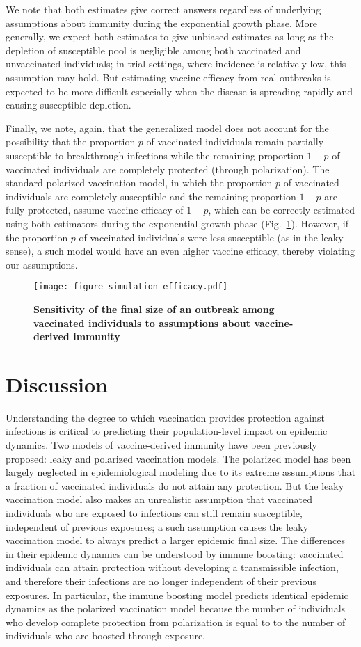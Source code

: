 \documentclass[12pt]{article}
\newcommand{\fref}[1]{Fig.~\ref{fig:#1}}
\begin{document}
We note that both estimates give correct answers regardless of underlying assumptions about immunity during the exponential growth phase.
More generally, we expect both estimates to give unbiased estimates as long as the depletion of susceptible pool is negligible among both vaccinated and unvaccinated individuals;
in trial settings, where incidence is relatively low, this assumption may hold.
But estimating vaccine efficacy from real outbreaks is expected to be more difficult especially when the disease is spreading rapidly and causing susceptible depletion.

Finally, we note, again, that the generalized model does not account for the possibility that the proportion $p$ of vaccinated individuals remain partially susceptible to breakthrough infections while the remaining proportion $1-p$ of vaccinated individuals are completely protected (through polarization).
The standard polarized vaccination model, in which the proportion $p$ of vaccinated individuals are completely susceptible and the remaining proportion $1-p$ are fully protected, assume vaccine efficacy of $1-p$, which can be correctly estimated using both estimators during the exponential growth phase (\fref{efficacy}).
However, if the proportion $p$ of vaccinated individuals were less susceptible (as in the leaky sense), a such model would have an even higher vaccine efficacy, thereby violating our assumptions.

\begin{figure}[!th]
\texttt{[image: figure\_simulation\_efficacy.pdf]}
\caption{
\textbf{Sensitivity of the final size of an outbreak among vaccinated individuals to assumptions about vaccine-derived immunity}
\label{fig:efficacy}
}
\end{figure}

\section*{Discussion}

Understanding the degree to which vaccination provides protection against infections is critical to predicting their population-level impact on epidemic dynamics.
Two models of vaccine-derived immunity have been previously proposed: leaky and polarized vaccination models.
The polarized model has been largely neglected in epidemiological modeling due to its extreme assumptions that a fraction of vaccinated individuals do not attain any protection. 
But the leaky vaccination model also makes an unrealistic assumption that vaccinated individuals who are exposed to infections can still remain susceptible, independent of previous exposures; 
a such assumption causes the leaky vaccination model to always predict a larger epidemic final size.
The differences in their epidemic dynamics can be understood by immune boosting: vaccinated individuals can attain protection without developing a transmissible infection, and therefore their infections are no longer independent of their previous exposures.
In particular, the immune boosting model predicts identical epidemic dynamics as the polarized vaccination model because the number of individuals who develop complete protection from polarization is equal to to the number of individuals who are boosted through exposure.
\end{document}
